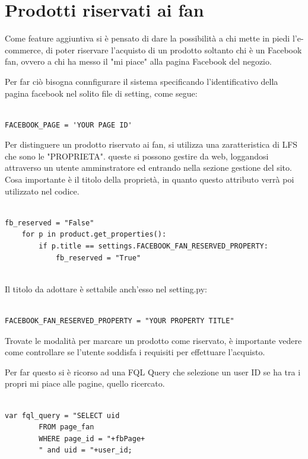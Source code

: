 \section{Prodotti riservati ai fan}
Come feature aggiuntiva si è pensato di dare la possibilità a chi mette in piedi l'e-commerce, di poter riservare l'acquisto di un prodotto soltanto chi è un Facebook fan, ovvero a chi ha messo il "mi piace" alla pagina Facebook del negozio.

Per far ciò bisogna connfigurare il sistema specificando l'identificativo della pagina facebook nel solito file di setting, come segue:
%

\begin{lstlisting}

FACEBOOK_PAGE = 'YOUR PAGE ID'

\end{lstlisting}

Per distinguere un prodotto riservato ai fan, si utilizza una zaratteristica di LFS che sono le "PROPRIETA". queste si possono gestire da web, loggandosi attraverso un utente amminstratore ed entrando nella sezione gestione del sito. Cosa importante è il titolo della proprietà, in quanto questo attributo verrà poi utilizzato nel codice.

\begin{lstlisting}

fb_reserved = "False"
    for p in product.get_properties():
        if p.title == settings.FACEBOOK_FAN_RESERVED_PROPERTY:
            fb_reserved = "True"
            
\end{lstlisting}

Il titolo da adottare è settabile anch'esso nel setting.py:

\begin{lstlisting}

FACEBOOK_FAN_RESERVED_PROPERTY = "YOUR PROPERTY TITLE"

\end{lstlisting}

Trovate le modalità per marcare un prodotto come riservato, è importante vedere come controllare se l'utente soddisfa i requisiti per effettuare l'acquisto.

Per far questo si è ricorso ad una FQL Query che selezione un user ID se ha tra i propri mi piace alle pagine, quello ricercato.

\begin{lstlisting}

var fql_query = "SELECT uid 
		FROM page_fan 
		WHERE page_id = "+fbPage+
		" and uid = "+user_id;
				
\end{lstlisting}

